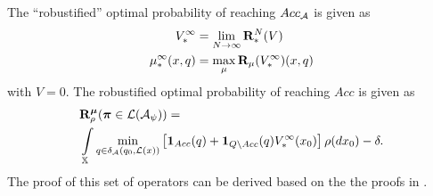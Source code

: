 \documentclass{ifacconf}
\begin{document}
The ``robustified'' optimal probability of reaching $Acc_{\mathcal{A}}$ is given as
\begin{align}
	V^\infty_\ast & =\lim_{N\rightarrow \infty}{\mathbf {R}}_\ast^N (V) \\
	{\mu}^\infty_\ast(x,q)  &= \max_{\mu} {\mathbf {R}}_{\mu} (V_\ast^\infty)(x,q) 
\end{align}
with $V=0$.
The robustified optimal probability of reaching $Acc$ is given as
\begin{align}
&\BelR_\init^\polb
(\word \in\mathcal L(\mathcal A_\psi))=\\ & \int_{\X}\min_{\bar q \in \delta_\FSA(q_0,\Labset(\bar x))}\left[\mathbf 1_{Acc}(\bar q)+ \mathbf 1_{Q \setminus Acc}(\bar q) V^\infty_\ast(x_0) \right]%
\init (d x_0)-\delta.
\end{align} 
The proof of this set of operators can be derived based on the the proofs in \citep{tech_report_TACAS}.
 




%
%
%
%
%
%  
%
%
%
\end{document}
